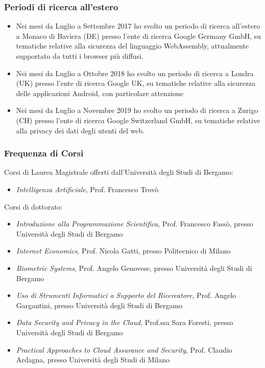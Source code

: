 \documentclass{article}
\begin{document}
\subsubsection*{Periodi di ricerca all'estero}

\begin{itemize}
	\item Nei mesi da Luglio a Settembre 2017 ho svolto un periodo di ricerca all'estero a Monaco di Baviera (DE) presso l'ente di ricerca Google Germany GmbH, su tematiche relative alla sicurezza del linguaggio WebAssembly, attualmente supportato da tutti i browser più diffusi.
	\item Nei mesi da Luglio a Ottobre 2018 ho svolto un periodo di ricerca a Londra (UK) presso l'ente di ricerca Google UK, su tematiche relative alla sicurezza delle applicazioni Android, con particolare attenzione
	\item Nei mesi da Luglio a Novembre 2019 ho svolto un periodo di ricerca a Zurigo (CH) presso l'ente di ricerca Google Switzerland GmbH, su tematiche relative alla privacy dei dati degli utenti del web.
\end{itemize}


\subsubsection*{Frequenza di Corsi}

\noindent Corsi di Laurea Magistrale offerti dall'Università degli Studi di Bergamo:

\begin{itemize}
	\item \textit{Intelligenza Artificiale}, Prof. Francesco Trovò
\end{itemize}

\smallskip
\noindent Corsi di dottorato:

\begin{itemize}
	\item \textit{Introduzione alla Programmazione Scientifica}, Prof. Francesco Fassò, presso Università degli Studi di Bergamo
	\item \textit{Internet Economics}, Prof. Nicola Gatti, presso Politecnico di Milano
	\item \textit{Biometric Systems}, Prof. Angelo Genovese, presso Università degli Studi di Bergamo
	\item \textit{Uso di Strumenti Informatici a Supporto del Ricercatore}, Prof. Angelo Gargantini, presso Università degli Studi di Bergamo
	\item \textit{Data Security and Privacy in the Cloud}, Prof.ssa Sara Foresti, presso Università degli Studi di Bergamo
	\item \textit{Practical Approaches to Cloud Assurance and Security}, Prof. Claudio Ardagna, presso Università degli Studi di Milano
\end{itemize}
\end{document}

